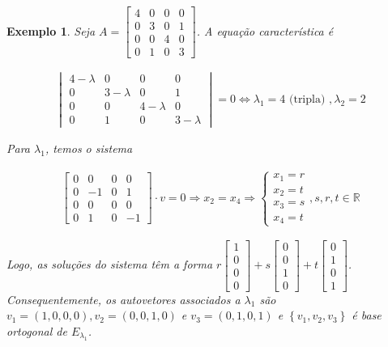 \documentclass{article}
\newtheorem*{example}{Exemplo}
\begin{document}
\begin{example}
	Seja $A = \begin{bmatrix}
	4 & 0 & 0 & 0 \\
	0 & 3 & 0 & 1 \\
	0 & 0 & 4 & 0 \\
	0 & 1 & 0 & 3
	\end{bmatrix}$. A equação característica é
	
	\begin{align*}
	\begin{vmatrix}
	4 - \lambda & 0 & 0 & 0 \\
	0 & 3-\lambda & 0 & 1 \\
	0 & 0 & 4 -\lambda& 0 \\
	0 & 1 & 0 & 3-\lambda
	\end{vmatrix} = 0 \Leftrightarrow \lambda_1 = 4\text{ (tripla) }, \lambda_2 = 2
	\end{align*}
	
	\par\vspace{0.3cm} Para $\lambda_1$, temos o sistema
	
	\begin{align*}
	\begin{bmatrix}
	0 & 0 & 0 & 0 \\
	0 & -1 & 0 & 1 \\
	0 & 0 & 0 & 0 \\
	0 & 1 & 0 & -1
	\end{bmatrix}\cdot v = 0 \Rightarrow x_2 = x_4 \Rightarrow \begin{cases}
	x_1 = r \\
	x_2 = t \\
	x_3 = s \\
	x_4 = t
	\end{cases}, s,r,t\in\mathbb{R}
	\end{align*}
	
	\par\vspace{0.3cm} Logo, as soluções do sistema têm a forma $r\begin{bmatrix}
	1\\
	0\\
	0\\
	0
	\end{bmatrix} + s\begin{bmatrix}
	0\\
	0\\
	1\\
	0
	\end{bmatrix} + t\begin{bmatrix}
	0\\
	1\\
	0\\
	1
	\end{bmatrix}$. Consequentemente, os autovetores associados a $\lambda_1$ são $v_1 = (1,0,0,0), v_2 = (0,0,1,0)$ e $v_3 = (0,1,0,1)$ e $\left\{v_1, v_2, v_3\right\}$ é base ortogonal de $E_{\lambda_1}$.
	

\end{example}
\end{document}
